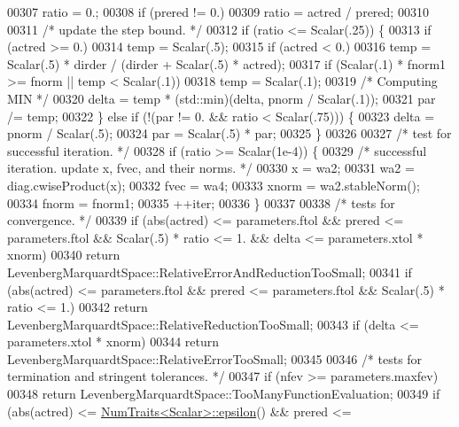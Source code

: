 \begin{DoxyCode}
00307         ratio = 0.;
00308         \textcolor{keywordflow}{if} (prered != 0.)
00309             ratio = actred / prered;
00310 
00311         \textcolor{comment}{/* update the step bound. */}
00312         \textcolor{keywordflow}{if} (ratio <= Scalar(.25)) \{
00313             \textcolor{keywordflow}{if} (actred >= 0.)
00314                 temp = Scalar(.5);
00315             \textcolor{keywordflow}{if} (actred < 0.)
00316                 temp = Scalar(.5) * dirder / (dirder + Scalar(.5) * actred);
00317             \textcolor{keywordflow}{if} (Scalar(.1) * fnorm1 >= fnorm || temp < Scalar(.1))
00318                 temp = Scalar(.1);
00319             \textcolor{comment}{/* Computing MIN */}
00320             delta = temp * (std::min)(delta, pnorm / Scalar(.1));
00321             par /= temp;
00322         \} \textcolor{keywordflow}{else} \textcolor{keywordflow}{if} (!(par != 0. && ratio < Scalar(.75))) \{
00323             delta = pnorm / Scalar(.5);
00324             par = Scalar(.5) * par;
00325         \}
00326 
00327         \textcolor{comment}{/* test for successful iteration. */}
00328         \textcolor{keywordflow}{if} (ratio >= Scalar(1e-4)) \{
00329             \textcolor{comment}{/* successful iteration. update x, fvec, and their norms. */}
00330             x = wa2;
00331             wa2 = diag.cwiseProduct(x);
00332             fvec = wa4;
00333             xnorm = wa2.stableNorm();
00334             fnorm = fnorm1;
00335             ++iter;
00336         \}
00337 
00338         \textcolor{comment}{/* tests for convergence. */}
00339         \textcolor{keywordflow}{if} (abs(actred) <= parameters.ftol && prered <= parameters.ftol && Scalar(.5) * ratio <= 1. && 
      delta <= parameters.xtol * xnorm)
00340             \textcolor{keywordflow}{return} LevenbergMarquardtSpace::RelativeErrorAndReductionTooSmall;
00341         \textcolor{keywordflow}{if} (abs(actred) <= parameters.ftol && prered <= parameters.ftol && Scalar(.5) * ratio <= 1.)
00342             \textcolor{keywordflow}{return} LevenbergMarquardtSpace::RelativeReductionTooSmall;
00343         \textcolor{keywordflow}{if} (delta <= parameters.xtol * xnorm)
00344             \textcolor{keywordflow}{return} LevenbergMarquardtSpace::RelativeErrorTooSmall;
00345 
00346         \textcolor{comment}{/* tests for termination and stringent tolerances. */}
00347         \textcolor{keywordflow}{if} (nfev >= parameters.maxfev)
00348             \textcolor{keywordflow}{return} LevenbergMarquardtSpace::TooManyFunctionEvaluation;
00349         \textcolor{keywordflow}{if} (abs(actred) <= \hyperlink{group___core___module_struct_eigen_1_1_num_traits}{NumTraits<Scalar>::epsilon}() && prered <= 

\end{DoxyCode}
